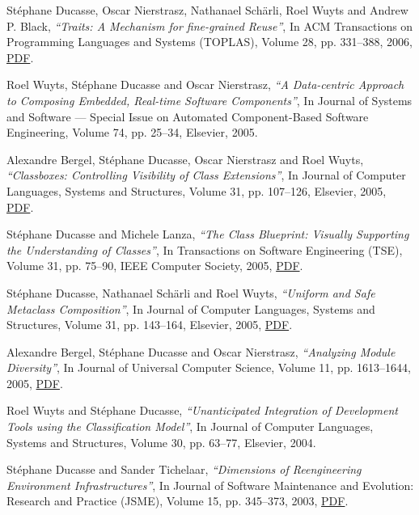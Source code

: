 \documentclass{article}
\newcommand{\czauthors}[1]{#1}
\newcommand{\cztitle}[1]{\emph{``#1''}}
\newcommand{\czjournal}[1]{#1}
\begin{document}
\begin{itemize}
	\pub  \czauthors{St\'ephane Ducasse, Oscar Nierstrasz, Nathanael Sch{\"a}rli, Roel Wuyts and Andrew P. Black},  \cztitle{Traits: A Mechanism for fine-grained Reuse},  In \czjournal{ACM Transactions on Programming Languages and Systems (TOPLAS)}, Volume 28, pp. 331--388, 2006, \href{http://rmod-files.lille.inria.fr/Team/Texts/Papers/Duca06bTOPLASTraits.pdf}{PDF}.

	\pub  \czauthors{Roel Wuyts, St\'ephane Ducasse and Oscar Nierstrasz},  \cztitle{A Data-centric Approach to Composing Embedded, Real-time Software Components},  In \czjournal{Journal of Systems and Software --- Special Issue on Automated Component-Based Software Engineering}, Volume 74, pp. 25--34, Elsevier, 2005.

	\pub  \czauthors{Alexandre Bergel, St\'ephane Ducasse, Oscar Nierstrasz and Roel Wuyts},  \cztitle{Classboxes: Controlling Visibility of Class Extensions},  In \czjournal{Journal of Computer Languages, Systems and Structures}, Volume 31, pp. 107--126, Elsevier, 2005, \href{http://rmod-files.lille.inria.fr/Team/Texts/Papers/Berg05a-CompLangESUG04-classboxesJournal.pdf}{PDF}.

	\pub  \czauthors{St\'ephane Ducasse and Michele Lanza},  \cztitle{The {Class} {Blueprint}: Visually Supporting the Understanding of Classes},  In \czjournal{Transactions on Software Engineering (TSE)}, Volume 31, pp. 75--90, IEEE Computer Society, 2005, \href{http://rmod-files.lille.inria.fr/Team/Texts/Papers/Duca05bTSEClassBlueprint.pdf}{PDF}.

	\pub  \czauthors{St\'ephane Ducasse, Nathanael Sch{\"a}rli and Roel Wuyts},  \cztitle{Uniform and Safe Metaclass Composition},  In \czjournal{Journal of Computer Languages, Systems and Structures}, Volume 31, pp. 143--164, Elsevier, 2005, \href{http://rmod-files.lille.inria.fr/Team/Texts/Papers/Duca05ySafeMetaclassTrait.pdf}{PDF}.

	\pub  \czauthors{Alexandre Bergel, St\'ephane Ducasse and Oscar Nierstrasz},  \cztitle{Analyzing Module Diversity},  In \czjournal{Journal of Universal Computer Science}, Volume 11, pp. 1613--1644, 2005, \href{http://rmod-files.lille.inria.fr/Team/Texts/Papers/Berg05cModuleDiversity.pdf}{PDF}.

	\pub  \czauthors{Roel Wuyts and St\'ephane Ducasse},  \cztitle{Unanticipated Integration of Development Tools using the Classification Model},  In \czjournal{Journal of Computer Languages, Systems and Structures}, Volume 30, pp. 63--77, Elsevier, 2004.

	\pub  \czauthors{St\'ephane Ducasse and Sander Tichelaar},  \cztitle{Dimensions of Reengineering Environment Infrastructures},  In \czjournal{Journal of Software Maintenance and Evolution: Research and Practice (JSME)}, Volume 15, pp. 345--373, 2003, \href{http://rmod-files.lille.inria.fr/Team/Texts/Papers/Duca03dInfrastructures.pdf}{PDF}.


\end{itemize}
\end{document}
